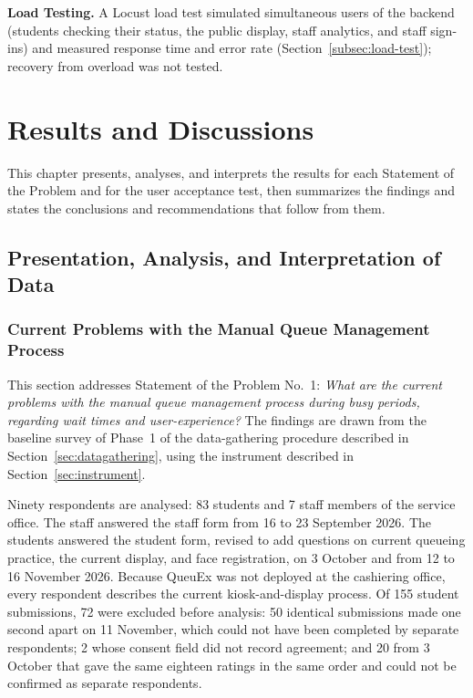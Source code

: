 \documentclass{research}
\newcommand{\sysname}{QueuEx}
\begin{document}
\textbf{Load Testing.} A Locust load test simulated simultaneous users
of the backend (students checking their status, the public display,
staff analytics, and staff sign-ins) and measured response time and
error rate (Section~\ref{subsec:load-test}); recovery from overload was
not tested.

\chapter{Results and Discussions}

This chapter presents, analyses, and interprets the results for each
Statement of the Problem and for the user acceptance test, then
summarizes the findings and states the conclusions and recommendations
that follow from them.

\section{Presentation, Analysis, and Interpretation of Data}
\label{sec:results-data}

\subsection{Current Problems with the Manual Queue Management Process}
\label{sec:sop1-results}

This section addresses Statement of the Problem No.~1: \emph{What are
the current problems with the manual queue management process during
busy periods, regarding wait times and user-experience?} The findings
are drawn from the baseline survey of Phase~1 of the data-gathering
procedure described in Section~\ref{sec:datagathering}, using the
instrument described in Section~\ref{sec:instrument}.

Ninety respondents are analysed: 83 students and 7 staff members of the
service office. The staff answered the staff form from 16 to 23
September 2026. The students answered the student form, revised to add
questions on current queueing practice, the current display, and face
registration, on 3 October and from 12 to 16 November 2026. Because
\sysname{} was not deployed at the cashiering office, every respondent
describes the current kiosk-and-display process. Of 155 student
submissions, 72 were excluded before analysis: 50 identical submissions
made one second apart on 11 November, which could not have been
completed by separate respondents; 2 whose consent field did not record
agreement; and 20 from 3 October that gave the same eighteen ratings in
the same order and could not be confirmed as separate respondents.
\end{document}
